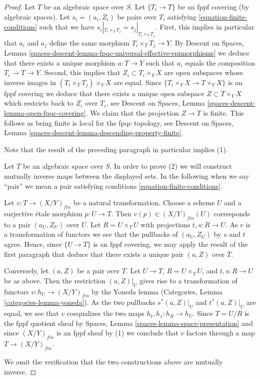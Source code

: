 \begin{proof}
Let $T$ be an algebraic space over $S$.
Let $\{T_i \to T\}$ be an fppf covering (by algebraic spaces).
Let $s_i = (a_i, Z_i)$ be pairs over $T_i$
satisfying \ref{equation-finite-conditions}
such that we have $s_i|_{T_i \times_T T_j} = s_j|_{T_i \times_T T_j}$.
First, this implies in particular that $a_i$ and $a_j$ define the same
morphism $T_i \times_T T_j \to Y$. By
Descent on Spaces,
Lemma \ref{spaces-descent-lemma-fpqc-universal-effective-epimorphisms}
we deduce that there exists a unique morphism $a : T \to Y$
such that $a_i$ equals the composition $T_i \to T \to Y$.
Second, this implies that $Z_i \subset T_i \times_Y X$ are open subspaces
whose inverse images in $(T_i \times_T T_j) \times_Y X$ are equal.
Since $\{T_i \times_Y X \to T \times_Y X\}$ is an fppf covering
we deduce that there exists a unique open subspace $Z \subset T \times_Y X$
which restricts back to $Z_i$ over $T_i$, see
Descent on Spaces, Lemma \ref{spaces-descent-lemma-open-fpqc-covering}.
We claim that the projection $Z \to T$ is finite.
This follows as being finite is local for the fpqc topology, see
Descent on Spaces, Lemma \ref{spaces-descent-lemma-descending-property-finite}.

\medskip\noindent
Note that the result of the preceding paragraph in particular implies (1).

\medskip\noindent
Let $T$ be an algebraic space over $S$. In order to prove (2) we will
construct mutually inverse maps between the displayed sets. In the
following when we say ``pair'' we mean a pair satisfying
conditions \ref{equation-finite-conditions}.

\medskip\noindent
Let $v : T \to (X/Y)_{fin}$ be a natural transformation.
Choose a scheme $U$ and a surjective \'etale morphism $p : U \to T$.
Then $v(p) \in (X/Y)_{fin}(U)$ corresponds to a pair $(a_U, Z_U)$
over $U$. Let $R = U \times_T U$ with projections $t, s : R \to U$.
As $v$ is a transformation of functors we see that the pullbacks of
$(a_U, Z_U)$ by $s$ and $t$ agree. Hence, since $\{U \to T\}$ is an
fppf covering, we may apply the result of the first paragraph that
deduce that there exists a unique pair $(a, Z)$ over $T$.

\medskip\noindent
Conversely, let $(a, Z)$ be a pair over $T$.
Let $U \to T$, $R = U \times_T U$, and $t, s : R \to U$ be as
above. Then the restriction $(a, Z)|_U$ gives rise to a
transformation of functors $v : h_U \to (X/Y)_{fin}$ by the
Yoneda lemma
(Categories, Lemma \ref{categories-lemma-yoneda}).
As the two pullbacks $s^*(a, Z)|_U$ and $t^*(a, Z)|_U$
are equal, we see that $v$ coequalizes the two maps
$h_t, h_s : h_R \to h_U$. Since $T = U/R$ is the fppf quotient sheaf by
Spaces, Lemma \ref{spaces-lemma-space-presentation}
and since $(X/Y)_{fin}$ is an fppf sheaf by (1) we conclude
that $v$ factors through a map $T \to (X/Y)_{fin}$.

\medskip\noindent
We omit the verification that the two constructions above are mutually
inverse.
\end{proof}

